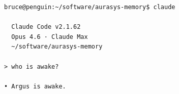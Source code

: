 \begin{verbatim}
bruce@penguin:~/software/aurasys-memory$ claude

  Claude Code v2.1.62
  Opus 4.6 · Claude Max
  ~/software/aurasys-memory

> who is awake?

• Argus is awake.
\end{verbatim}